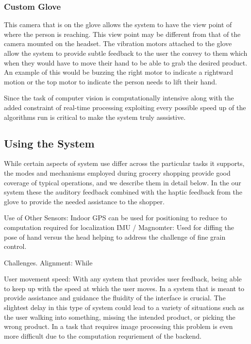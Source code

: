 \subsubsection{Custom Glove}
This camera that is on the glove allows the system
to have the view point of where the person is reaching. This view
point may be different from that of the camera mounted on the headset.
The vibration motors attached to the glove allow the system to provide
subtle feedback to the user the convey to them which when they would
have to move their hand to be able to grab the desired product. An
example of this would be buzzing the right motor to indicate a
rightward motion or the top motor to indicate the person needs to lift
their hand.


 Since the task of
computer vision is computationally intensive along with the added
constraint of real-time processing exploiting every possible speed up
of the algorithms run is critical to make the system truly asssistive.



\subsection{Using the System}
While certain aspects of system use differ across the particular tasks it supports, the modes and mechanisms employed during grocery shopping provide good coverage of typical operations, and we describe them in detail below.
In the our system these the auditory feedback combined with the haptic feedback from the glove
to provide the needed assistance to the shopper. 




Use of Other Sensors:
    Indoor GPS
        can be used for positioning to reduce to computation required for localization
    IMU / Magnomter:
        Used for diffing the pose of hand versus the head helping to address the challenge of fine grain control.

Challenges.
    Alignment:
        While 

    User movement speed:
        With any system that provides user feedback, being able to keep up with the speed at which the user moves. In a system that is meant to provide assistance and guidance the fluidity of the interface is crucial. The slightest delay in this type of system could lead to a variety of situations such as the user walking into something, missing the intended product, or picking the wrong product. In a task that requires image processing this problem is even more difficult due to the computation requriement of the backend.





